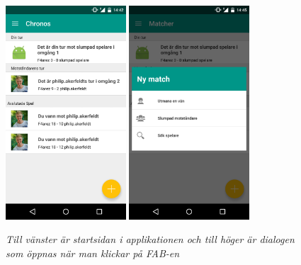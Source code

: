 \documentclass[a4paper, 11pt]{article}
\begin{document}
\begin{enumerate}
\begin{figure}[H]
\begin{center}
	\includegraphics[width=0.4\textwidth]{app_matches} 
	\includegraphics[width=0.4\textwidth]{app_new_match} 
	\caption{\textit{Till vänster är startsidan i applikationen och till höger är dialogen som öppnas när man klickar på FAB-en}}
	\end{center}
\end{figure}




\end{enumerate}
\end{document}
